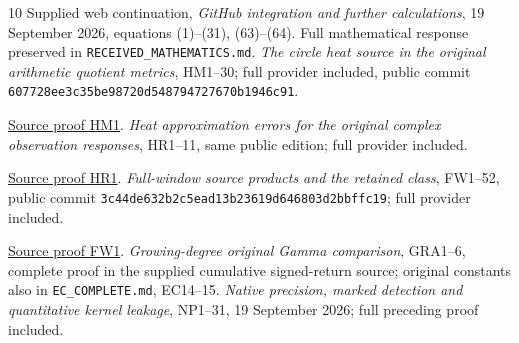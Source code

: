 \documentclass[11pt]{article}
\begin{document}
\begin{thebibliography}{10}
 Supplied web continuation, \emph{GitHub integration and further
calculations}, 19 September 2026, equations (1)--(31), (63)--(64).
Full mathematical response preserved in \texttt{RECEIVED\_MATHEMATICS.md}.
 \emph{The circle heat source in the original arithmetic quotient
metrics}, HM1--30; full provider included, public commit
\texttt{607728ee3c35be98720d548794727670b1946c91}.

\href{https://github.com/KokunoYumeto/zeta-function-research-reader/blob/5992ad50c0f2a06921f1fcaded7b4e38097c0739/workbenches/splitzero-tandem/continuations/20260920-original-kernel-mixed-determinants/providers/HEAT_TO_ORIGINAL_QUOTIENT_METRICS.tex\#L31}{Source proof HM1}.
 \emph{Heat approximation errors for the original complex
observation responses}, HR1--11, same public edition; full provider included.

\href{https://github.com/KokunoYumeto/zeta-function-research-reader/blob/5992ad50c0f2a06921f1fcaded7b4e38097c0739/workbenches/splitzero-tandem/continuations/20260920-original-kernel-mixed-determinants/providers/HEAT_OBSERVATION_RESPONSE_ERRORS.tex\#L22}{Source proof HR1}.
 \emph{Full-window source products and the retained class},
FW1--52, public commit \texttt{3c44de632b2c5ead13b23619d646803d2bbffc19};
full provider included.

\href{https://github.com/KokunoYumeto/zeta-function-research-reader/blob/5992ad50c0f2a06921f1fcaded7b4e38097c0739/workbenches/splitzero-tandem/continuations/20260920-original-kernel-mixed-determinants/providers/FULL_WINDOW_SOURCE_PRODUCTS.tex\#L28}{Source proof FW1}.
 \emph{Growing-degree original Gamma comparison}, GRA1--6,
complete proof in the supplied cumulative signed-return source;
original constants also in \texttt{EC\_COMPLETE.md}, EC14--15.
 \emph{Native precision, marked detection and quantitative kernel
leakage}, NP1--31, 19 September 2026; full preceding proof included.


\end{thebibliography}
\end{document}
